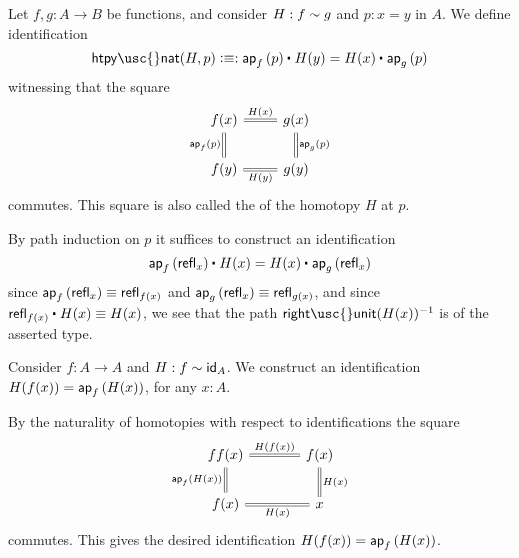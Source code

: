 \begin{defn}\label{defn:htpy_nat}
Let $f,g:A\to B$ be functions, and consider $H:f\htpy g$ and $p:x=y$ in $A$. We define identification
\begin{equation*}
\mathsf{htpy\usc{}nat}(H,p) \defeq  :\ct{\ap{f}{p}}{H(y)}=\ct{H(x)}{\ap{g}{p}}
\end{equation*}
witnessing that the square
\begin{equation*}
\begin{tikzcd}
f(x) \arrow[r,equals,"H(x)"] \arrow[d,equals,swap,"\ap{f}{p}"] & g(x) \arrow[d,equals,"\ap{g}{p}"] \\
f(y) \arrow[r,equals,swap,"H(y)"] & g(y)
\end{tikzcd}
\end{equation*}
commutes. This square is also called the  of the homotopy $H$ at $p$.
\end{defn}

\begin{constr}
  By path induction on $p$ it suffices to construct an identification
  \begin{equation*}
    \ct{\ap{f}{\refl{x}}}{H(x)}=\ct{H(x)}{\ap{g}{\refl{x}}}
  \end{equation*}
  since $\ap{f}{\refl{x}}\jdeq \refl{f(x)}$ and $\ap{g}{\refl{x}}\jdeq\refl{g(x)}$, and since $\ct{\refl{f(x)}}{H(x)}\jdeq H(x)$, we see that the path $\mathsf{right\usc{}unit}(H(x))^{-1}$ is of the asserted type.
\end{constr}

\begin{defn}\label{defn:retraction_swap}
Consider $f:A\to A$ and $H: f\htpy \idfunc[A]$. We construct an identification $H(f(x))=\ap{f}{H(x)}$, for any $x:A$.
\end{defn}

\begin{constr}
By the naturality of homotopies with respect to identifications the square
\begin{equation*}
\begin{tikzcd}[column sep=large]
ff(x) \arrow[d,swap,equals,"\ap{f}{H(x)}"] \arrow[r,equals,"H(f(x))"] & f(x) \arrow[d,equals,"H(x)"] \\
f(x) \arrow[r,swap,equals,"H(x)"] & x
\end{tikzcd}
\end{equation*}
commutes. This gives the desired identification $H(f(x))=\ap{f}{H(x)}$.
\end{constr}

